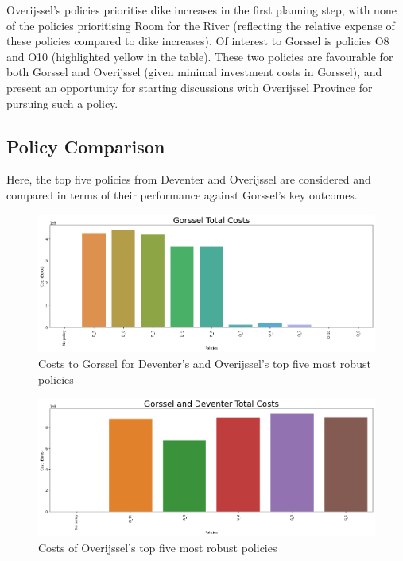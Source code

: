 \noindent Overijssel's policies prioritise dike increases in the first planning step, with none of the policies prioritising Room for the River (reflecting the relative expense of these policies compared to dike increases). Of interest to Gorssel is policies O8 and O10 (highlighted yellow in the table). These two policies are favourable for both Gorssel and Overijssel (given minimal investment costs in Gorssel), and present an opportunity for starting discussions with Overijssel Province for pursuing such a policy.

\subsection{Policy Comparison}
Here, the top five policies from Deventer and Overijssel are considered and compared in terms of their performance against Gorssel's key outcomes.

\begin{figure}[h!]
    \centering
    \includegraphics[width=\textwidth]{report/figures/results/spreads/cost_policies_Gorssel.png}
    \caption{Costs to Gorssel for Deventer's and Overijssel's top five most robust policies}
    \label{fig:cost-pol-g}
\end{figure}

\begin{figure}[h!]
    \centering
    \includegraphics[width=\textwidth]{report/figures/results/spreads/cost_policies_Overijssel.png}
    \caption{Costs of Overijssel's top five most robust policies}
    \label{fig:cost-pol-o}
\end{figure}

